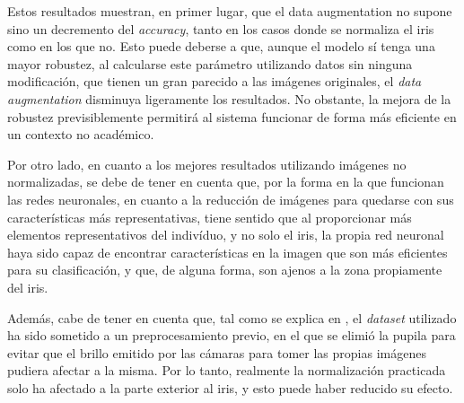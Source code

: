 Estos resultados muestran, en primer lugar, que el data augmentation no supone sino un decremento del \textit{accuracy}, tanto en los casos donde se normaliza el iris
como en los que no. Esto puede deberse a que, aunque el modelo sí tenga una mayor robustez, al calcularse este parámetro utilizando datos sin ninguna modificación, que 
tienen un gran parecido a las imágenes originales, el \textit{data augmentation} disminuya ligeramente los resultados. No obstante, la mejora de la robustez previsiblemente
permitirá al sistema funcionar de forma más eficiente en un contexto no académico.

Por otro lado, en cuanto a los mejores resultados utilizando imágenes no normalizadas, se debe de tener en cuenta que, por la forma en la que funcionan las redes neuronales,
en cuanto a la reducción de imágenes para quedarse con sus características más representativas, tiene sentido que al proporcionar más elementos representativos del indivíduo,
y no solo el iris, la propia red neuronal haya sido capaz de encontrar características en la imagen que son más eficientes para su clasificación, y que, de alguna forma, son
ajenos a la zona propiamente del iris.

Además, cabe de tener en cuenta que, tal como se explica en , el \textit{dataset} utilizado ha sido sometido a un preprocesamiento previo, en el que se elimió la pupila 
para evitar que el brillo emitido por las cámaras para tomer las propias imágenes pudiera afectar a la misma. Por lo tanto, realmente la normalización practicada solo ha afectado a la 
parte exterior al iris, y esto puede haber reducido su efecto.

